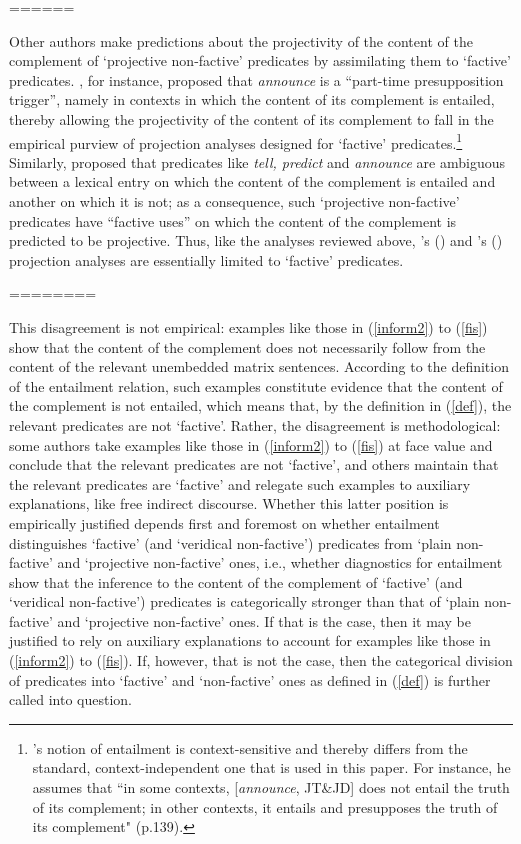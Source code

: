 \documentclass[11pt,fleqn]{article}
\newcommand{\6}{\mbox{$[\hspace*{-.6mm}[$}}
\newcommand{\9}{\mbox{$]\hspace*{-.6mm}]$}}
\newcommand{\citepos}[1]{\citeauthor{#1}'s \citeyear{#1}}
\newcommand{\citetpos}[1]{\citeauthor{#1}'s (\citeyear{#1})}
\begin{document}
{======

Other authors make predictions about the projectivity of the content of the complement of `projective non-factive' predicates by assimilating them to `factive' predicates. \citet[139]{schlenker10}, for instance, proposed that {\em announce} is a ``part-time presupposition trigger'', namely in contexts in which the content of its complement is entailed, thereby allowing the projectivity of the content of its complement to fall in the empirical purview of projection analyses designed for `factive' predicates.\footnote{\citepos{schlenker10} notion of entailment is context-sensitive and thereby differs from the standard, context-independent one that is used in this paper. For instance, he assumes that ``in some contexts, [{\em announce}, JT\&JD] does not entail the truth of its complement; in other contexts, it entails and presupposes the truth of its complement" (p.139).}  Similarly, \citet[1736]{spector-egre2015} proposed that predicates like {\em tell, predict} and {\em announce}  are ambiguous between a lexical entry on which the content of the complement is entailed and another on which it is not; as a consequence, such `projective non-factive' predicates have ``factive uses'' on which the content of the complement is predicted to be projective. Thus, like the analyses reviewed above, \citetpos{schlenker10} and \citetpos{spector-egre2015} projection analyses are essentially limited to `factive' predicates.

========

This disagreement is not empirical: examples like those in (\ref{inform2}) to (\ref{fis}) show that the content of the complement does not necessarily follow from the content of the relevant unembedded matrix sentences. According to the definition of the entailment relation, such examples constitute evidence that the content of the complement is not entailed, which means that, by the definition in (\ref{def}), the relevant predicates are not `factive'. Rather, the disagreement is methodological: some authors take examples like those in (\ref{inform2}) to (\ref{fis}) at face value and conclude that the relevant predicates are not `factive', and others maintain that the relevant predicates are `factive' and relegate such examples to auxiliary explanations, like free indirect discourse. Whether this latter position is empirically justified depends first and foremost on whether entailment distinguishes `factive' (and `veridical non-factive') predicates from `plain non-factive' and `projective non-factive' ones, i.e., whether diagnostics for entailment show that the inference to the content of the complement of `factive' (and `veridical non-factive') predicates is categorically stronger than that of `plain non-factive' and `projective non-factive' ones. If that is the case, then it may be justified to rely on auxiliary explanations to account for examples like those in (\ref{inform2}) to (\ref{fis}). If, however, that is not the case, then the categorical division of predicates into `factive' and `non-factive' ones as defined in (\ref{def}) is further called into question. 

}
\end{document}
